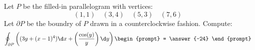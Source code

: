 \documentclass{ximera}
\begin{document}
\begin{exercise}
  Let $P$ be the filled-in parallelogram with vertices:
  \[
  (1,1)\quad (3,4)\quad (5,3)\quad (7,6) 
  \]
  Let $\partial P$ be the boundry of $P$ drawn in a counterclockwise
  fashion. Compute:
  \[
  \oint_{\partial P} \left( (3y+(x-1)^4)\d x + \left(\frac{\cos(y)}{y}\right)\d y\right)
  \begin{prompt}
    = \answer{-24}
  \end{prompt}
  \]
\end{exercise}
\end{document}
